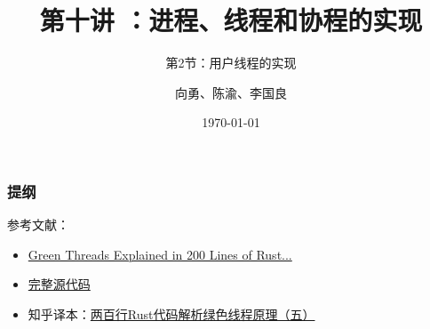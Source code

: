 



\title[第10讲]{第十讲 ：进程、线程和协程的实现} %
\subtitle{第2节：用户线程的实现}
\author{向勇、陈渝、李国良} %
\date{\today} %




\begin{frame}
\titlepage %
\end{frame}

\begin{frame}
\frametitle{提纲} %
\tableofcontents %
参考文献：
    \begin{itemize}
        \item \href{https://cfsamson.gitbook.io/green-threads-explained-in-200-lines-of-rust/}{Green Threads Explained in 200 Lines of Rust...}
        \item \href{https://github.com/cfsamson/example-greenthreads}{完整源代码}
        \item 知乎译本：\href{https://zhuanlan.zhihu.com/p/101168659}{两百行Rust代码解析绿色线程原理（五）}
    \end{itemize}
% 
\end{frame}
